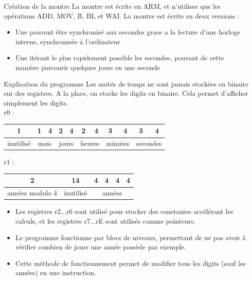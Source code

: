\documentclass[11pt]{beamer}
\begin{document}
\begin{frame}{Création de la montre}
  La montre est écrite en ARM, et n'utilises que les opérations ADD, MOV, B, BL
  et WAI. La montre est écrite en deux versions :
  \begin{itemize}
  \item{Une pouvant être synchronisé aux secondes grace a la lecture d'une
      horloge interne, synchronisée à l'ordinateur}
  \item{Une itérant le plus rapidement possible les secondes, pouvant de cette
      manière parcourir quelques jours en une seconde}
  \end{itemize}
\end{frame}

\begin{frame}{Explication du programme}
  Les unités de temps ne sont jamais stockées en binaire sur des registres. A la
  place, on stocke les digits en binaire. Cela permet d'afficher simplement les
  digits.\\

  r0 : 
  \begin{tabular}{|c|c|c|c|c|c|c|c|c|c|c|}
    \hline
    1 & 1 & 4 & 2 & 4 & 2 & 4 & 3 & 4 & 3 & 4\\
    \hline
    inutilisé & \multicolumn{2}{c|}{mois} & \multicolumn{2}{c|}{jours} & \multicolumn{2}{c|}{heures} & \multicolumn{2}{c|}{minutes} & \multicolumn{2}{c|}{secondes} \\
    \hline
  \end{tabular}

  r1 :
  \begin{tabular}{|c|c|c|c|c|c|}
    \hline
    2 & 14 & 4 & 4 & 4 & 4\\
    \hline
    années modulo 4 & inutilisé & \multicolumn{4}{c|}{années} \\
    \hline
  \end{tabular}
 
  \begin{itemize}
  \item Les registres r2...r6 sont utilisé pour stocker des constantes accélérant les
  calculs, et les registres r7...rE sont utilisés comme pointeurs.\\

  
  \item Le programme fonctionne par blocs de niveaux, permettant de ne pas avoir à
  vérifier combien de jours une année possède par exemple.\\

  
  \item Cette méthode de fonctionnement permet de modifier tous les digits (sauf les
  années) en une instruction.
  \end{itemize}
\end{frame}
\end{document}
